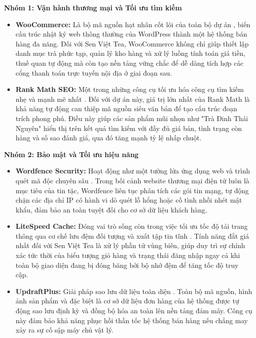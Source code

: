 \textbf{Nhóm 1: Vận hành thương mại và Tối ưu tìm kiếm}
\begin{itemize}
	\item \textbf{WooCommerce:} Là bộ mã nguồn hạt nhân cốt lõi của toàn bộ dự án \cite{plugin_woocommerce}, biến cấu trúc nhật ký web thông thường của WordPress thành một hệ thống bán hàng đa năng. Đối với Sen Việt Tea, WooCommerce không chỉ giúp thiết lập danh mục trà phức tạp, quản lý kho hàng và xử lý luồng tính toán giá tiền, thuế quan tự động mà còn tạo nền tảng vững chắc để dễ dàng tích hợp các cổng thanh toán trực tuyến nội địa ở giai đoạn sau.
	\item \textbf{Rank Math SEO:} Một trong những công cụ tối ưu hóa công cụ tìm kiếm nhẹ và mạnh mẽ nhất \cite{plugin_rankmath}. Đối với dự án này, giá trị lớn nhất của Rank Math là khả năng tự động can thiệp mã nguồn siêu văn bản để tạo cấu trúc đoạn trích phong phú. Điều này giúp các sản phẩm mũi nhọn như "Trà Đinh Thái Nguyên" hiển thị trên kết quả tìm kiếm với đầy đủ giá bán, tình trạng còn hàng và số sao đánh giá, qua đó tăng mạnh tỷ lệ nhấp chuột.
\end{itemize}

\textbf{Nhóm 2: Bảo mật và Tối ưu hiệu năng}
\begin{itemize}
	\item \textbf{Wordfence Security:} Hoạt động như một tường lửa ứng dụng web và trình quét mã độc chuyên sâu \cite{plugin_wordfence}. Trong bối cảnh website thương mại điện tử luôn là mục tiêu của tin tặc, Wordfence liên tục phân tích các gói tin mạng, tự động chặn các địa chỉ IP có hành vi dò quét lỗ hổng hoặc cố tình nhồi nhét mật khẩu, đảm bảo an toàn tuyệt đối cho cơ sở dữ liệu khách hàng.
	\item \textbf{LiteSpeed Cache:} Đóng vai trò sống còn trong việc tối ưu tốc độ tải trang thông qua cơ chế lưu đệm đối tượng và xuất tập tin tĩnh \cite{plugin_litespeed}. Tính năng đắt giá nhất đối với Sen Việt Tea là xử lý phần tử vùng biên, giúp duy trì sự chính xác tức thời của biểu tượng giỏ hàng và trạng thái đăng nhập ngay cả khi toàn bộ giao diện đang bị đóng băng bởi bộ nhớ đệm để tăng tốc độ truy cập.
	\item \textbf{UpdraftPlus:} Giải pháp sao lưu dữ liệu toàn diện \cite{plugin_updraftplus}. Toàn bộ mã nguồn, hình ảnh sản phẩm và đặc biệt là cơ sở dữ liệu đơn hàng của hệ thống được tự động sao lưu định kỳ và đồng bộ hóa an toàn lên nền tảng đám mây. Công cụ này đảm bảo khả năng phục hồi thần tốc hệ thống bán hàng nếu chẳng may xảy ra sự cố sập máy chủ vật lý.
\end{itemize}

